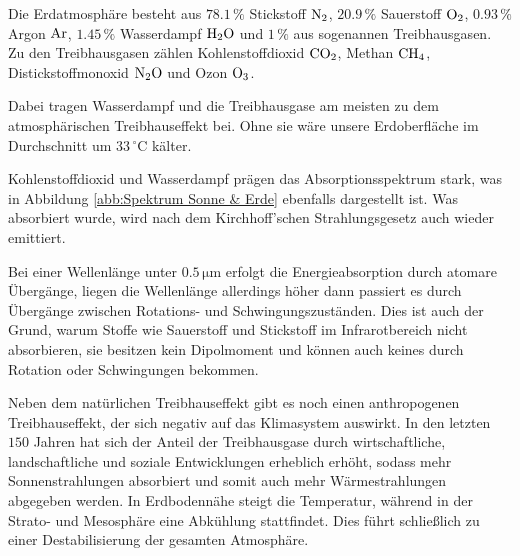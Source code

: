 \documentclass[12pt,a4paper]{scrartcl}
\numberwithin{equation}{section} %
\begin{document}
	Die Erdatmosphäre besteht aus $78.1\,\%$ Stickstoff $\ce{N_2}$, $20.9\,\%$ Sauerstoff $\ce{O_2}$, $0.93\,\%$ Argon $\ce{Ar}$, $1.45\,\%$ Wasserdampf $\ce{H_2O}$ und $1\,\%$ aus sogenannen Treibhausgasen. Zu den Treibhausgasen zählen Kohlenstoffdioxid $\ce{CO_2}$, Methan $\ce{CH_4}$, Distickstoffmonoxid $\ce{N_2O}$ und Ozon $\ce{O_3}$.
	
	Dabei tragen Wasserdampf und die Treibhausgase am meisten zu dem atmosphärischen Treibhauseffekt bei. Ohne sie wäre unsere Erdoberfläche im Durchschnitt um $33\mathrm{\,^\circ C}$ kälter. \cite{BakanRaschke}
	
	Kohlenstoffdioxid und Wasserdampf prägen das Absorptionsspektrum stark, was in Abbildung \ref{abb:Spektrum Sonne & Erde} ebenfalls dargestellt ist. Was absorbiert wurde, wird nach dem Kirchhoff'schen Strahlungsgesetz auch wieder emittiert.
	
	Bei einer Wellenlänge unter $0.5\mathrm{\,\mu m}$ erfolgt die Energieabsorption durch atomare Übergänge, liegen die Wellenlänge allerdings höher dann passiert es durch Übergänge zwischen Rotations- und Schwingungszuständen. Dies ist auch der Grund, warum Stoffe wie Sauerstoff und Stickstoff im Infrarotbereich nicht absorbieren, sie besitzen kein Dipolmoment und können auch keines durch Rotation oder Schwingungen bekommen. \cite{BakanRaschke}
	
	Neben dem natürlichen Treibhauseffekt gibt es noch einen anthropogenen Treibhauseffekt, der sich negativ auf das Klimasystem auswirkt. In den letzten $150$ Jahren hat sich der Anteil der Treibhausgase durch wirtschaftliche, landschaftliche und soziale Entwicklungen erheblich erhöht, sodass mehr Sonnenstrahlungen absorbiert und somit auch mehr Wärmestrahlungen abgegeben werden. In Erdbodennähe steigt die Temperatur, während in der Strato- und Mesosphäre eine Abkühlung stattfindet. Dies führt schließlich zu einer Destabilisierung der gesamten Atmosphäre. \cite{BakanRaschke}
	
\end{document}
